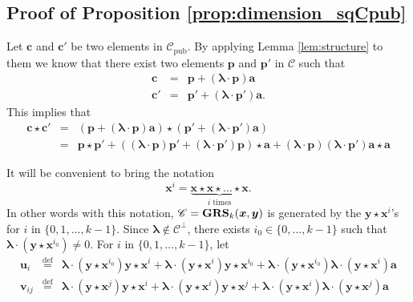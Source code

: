 \documentclass[runningheads,11pt]{llncs}
\newcommand{\eqdef}{\stackrel{\text{def}}{=}}
\newcommand{\code}[1]{\ensuremath{\mathscr{#1}}}
\newcommand{\Cpub}{\code{C}_{\text{pub}}}
\newcommand{\CC}{\code{C}}
\newcommand{\scp}[2]{#1\cdot #2}
\newcommand{\cwp}{\star}
\newcommand{\word}[1]{\ensuremath{\boldsymbol{#1}}}
\newcommand{\av}{\word{a}}
\newcommand{\lambdav}{\word{\lambda}}
\newcommand{\cv}{\word{c}}
\newcommand{\pv}{\word{p}}
\newcommand{\uv}{\word{u}}
\newcommand{\vv}{\word{v}}
\newcommand{\xv}{\word{x}}
\newcommand{\yv}{\word{y}}
\newcommand{\GRS}[3]{\text{\bf GRS}_{#1}(#2,#3)}
\begin{document}
 \subsection{Proof of Proposition \ref{prop:dimension_sqCpub}}
 
 Let $\cv$ and $\cv'$ be two elements in $\Cpub$. By applying Lemma \ref{lem:structure} to them we know that there exist two elements
 $\pv$ and $\pv'$ in $\CC$ such that
 \begin{eqnarray*}
 \cv & = & \pv + (\scp{\lambdav}{\pv})\av\\
  \cv' & = & \pv' + (\scp{\lambdav}{\pv'})\av.
 \end{eqnarray*}
 This implies that
 \begin{eqnarray}
 \cv \cwp \cv' & = & (\pv + (\scp{\lambdav}{\pv})\av) \cwp (\pv' + (\scp{\lambdav}{\pv'})\av) \nonumber \\
 &= &\pv \cwp \pv' + ((\scp{\lambdav}{\pv})\pv'+(\scp{\lambdav}{\pv'})\pv)\cwp \av + (\scp{\lambdav}{\pv})(\scp{\lambdav}{\pv'}) \av \cwp \av
 \label{eq:long_expression}
\end{eqnarray}
 
 It will be convenient to bring the notation
 $$
 \xv^i = \underbrace{\xv \cwp \xv \cwp \dots \cwp \xv}_{\text{$i$ times}}.
 $$
 In other words with this notation, $\CC=\GRS{k}{\xv}{\yv}$ is generated by the
 $\yv \cwp \xv^i$'s for $i$ in $\{0,1,\dots,k-1\}$. 
 Since $\lambdav \notin \CC^\perp$, there exists $i_0 \in \{0,\dots,k-1\}$ such that
 $\scp{\lambdav}{(\yv \cwp \xv^{i_0})} \neq 0$.
 For $i$ in $\{0,1,\dots,k-1\}$, let 
 \begin{eqnarray*}
 \uv_i &\eqdef  &\scp{\lambdav}{(\yv \cwp \xv^{i_0})}\yv\cwp \xv^i +\scp{\lambdav}{(\yv \cwp \xv^{i})}\yv \cwp \xv^{i_0}+ \scp{\lambdav}{(\yv \cwp \xv^{i_0})}\scp{\lambdav}{(\yv \cwp \xv^{i})} \av \\
 \vv_{ij} & \eqdef & \scp{\lambdav}{(\yv \cwp \xv^{j})}\yv\cwp \xv^i +\scp{\lambdav}{(\yv \cwp \xv^{i})}\yv \cwp \xv^{j}+ \scp{\lambdav}{(\yv \cwp \xv^{i})}\scp{\lambdav}{(\yv \cwp \xv^{j})} \av
 \end{eqnarray*}
 
\end{document}
